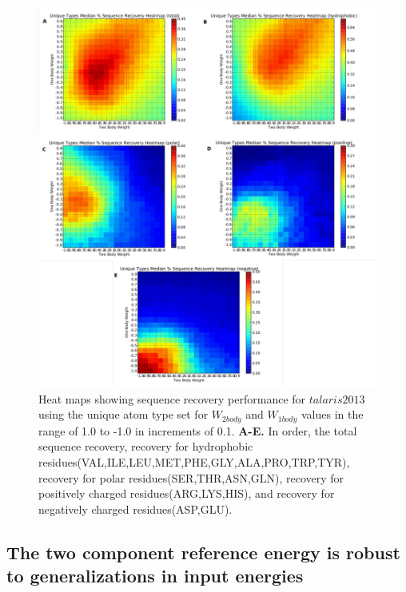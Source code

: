 \begin{figure}[hbtp]
  \includegraphics[width=\linewidth]{Figures/unique_types_broad_gridsearch_classes.pdf}
  \caption{Heat maps showing sequence recovery performance for $talaris2013$ using the unique atom type set for $W_{2body}$ and $W_{1body}$ values in the range of 1.0 to -1.0 in increments of 0.1.
  \textbf{A-E.} In order, the total sequence recovery, recovery for hydrophobic residues(VAL,ILE,LEU,MET,PHE,GLY,ALA,PRO,TRP,TYR), recovery for polar residues(SER,THR,ASN,GLN), recovery for positively charged residues(ARG,LYS,HIS), and recovery for negatively charged residues(ASP,GLU).}
  \label{fig:gridsearch_classes}
\end{figure}

\subsection{The two component reference energy is robust to generalizations in input energies}
